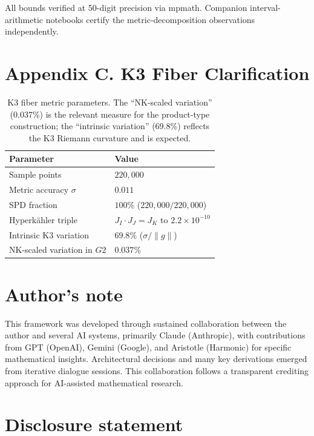 \documentclass[11pt,a4paper]{article}
\theoremstyle{definition}
\theoremstyle{remark}
\newcommand{\Gtwo}{\mathrm{G}_2}
\def\Gtwo{G2}%
\begin{document}
All bounds verified at 50-digit precision via mpmath. Companion interval-arithmetic notebooks certify the metric-decomposition observations independently.

\section*{Appendix C. K3 Fiber Clarification}

\begin{table}[ht]
\centering
\begin{tabular}{ll}
\toprule
Parameter & Value \\
\midrule
Sample points & $220{,}000$ \\
Metric accuracy $\sigma$ & $0.011$ \\
SPD fraction & $100\%$ ($220{,}000/220{,}000$) \\
Hyperk\"ahler triple & $J_I \cdot J_J = J_K$ to $2.2 \times 10^{-10}$ \\
Intrinsic K3 variation & $69.8\%$ ($\sigma/\|g\|$) \\
NK-scaled variation in $\Gtwo$ & $0.037\%$ \\
\bottomrule
\end{tabular}
\caption{K3 fiber metric parameters. The ``NK-scaled variation'' (0.037\%) is the relevant measure for the product-type construction; the ``intrinsic variation'' (69.8\%) reflects the K3 Riemann curvature and is expected.}
\end{table}

\section*{Author's note}

This framework was developed through sustained collaboration between the author and several AI systems, primarily Claude (Anthropic), with contributions from GPT (OpenAI), Gemini (Google), and Aristotle (Harmonic) for specific mathematical insights. Architectural decisions and many key derivations emerged from iterative dialogue sessions. This collaboration follows a transparent crediting approach for AI-assisted mathematical research.

\section*{Disclosure statement}
\end{document}
